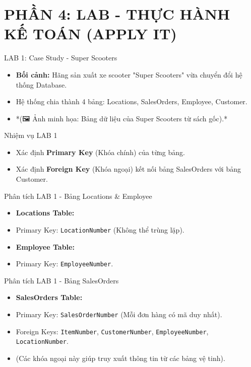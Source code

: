 \documentclass[aspectratio=169]{beamer}
\begin{document}
\section{PHẦN 4: LAB - THỰC HÀNH KẾ TOÁN (APPLY IT)}


\begin{frame}{LAB 1: Case Study - Super Scooters}
    \begin{itemize}
        \item \textbf{Bối cảnh:} Hãng sản xuất xe scooter "Super Scooters" vừa chuyển đổi hệ thống Database.
        \item Hệ thống chia thành 4 bảng: Locations, SalesOrders, Employee, Customer.
        \item *(🖼️ Ảnh minh họa: Bảng dữ liệu của Super Scooters từ sách gốc).*
    \end{itemize}
\end{frame}


\begin{frame}{Nhiệm vụ LAB 1}
    \begin{itemize}
        \item Xác định \textbf{Primary Key} (Khóa chính) của từng bảng.
        \item Xác định \textbf{Foreign Key} (Khóa ngoại) kết nối bảng SalesOrders với bảng Customer.
    \end{itemize}
\end{frame}


\begin{frame}{Phân tích LAB 1 - Bảng Locations \& Employee}
    \begin{itemize}
        \item \textbf{Locations Table:}
        \item Primary Key: \texttt{LocationNumber} (Không thể trùng lặp).
        \item \textbf{Employee Table:}
        \item Primary Key: \texttt{EmployeeNumber}.
    \end{itemize}
\end{frame}


\begin{frame}{Phân tích LAB 1 - Bảng SalesOrders}
    \begin{itemize}
        \item \textbf{SalesOrders Table:}
        \item Primary Key: \texttt{SalesOrderNumber} (Mỗi đơn hàng có mã duy nhất).
        \item Foreign Keys: \texttt{ItemNumber}, \texttt{CustomerNumber}, \texttt{EmployeeNumber}, \texttt{LocationNumber}.
        \item (Các khóa ngoại này giúp truy xuất thông tin từ các bảng vệ tinh).
    \end{itemize}
\end{frame}
\end{document}
